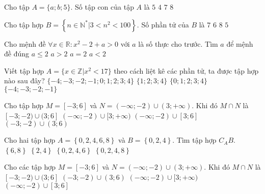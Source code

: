 \begin{ex}%
	Cho tập $A=\{a;b;5\}$. Số tập con của tập $A$ là
	\choice
	{$5$}
	{$4$}
	{$7$}
	{\True $8$}
\end{ex}

\begin{ex}%
	Cho tập hợp $B=\left\{n \in \mathbb{N}^*\bigg|3<n^2<100\right\}$. Số phần tử của $B$ là
	\choice
	{$7$}
	{$6$}
	{\True $8$}
	{$5$}
\end{ex}

\begin{ex}%
	Cho mệnh đề $\forall x \in \mathbb{R} \colon x^2-2+a>0$ với $a$ là số thực cho trước. Tìm $a$ để mệnh đề đúng
	\choice
	{$a \leq 2$}
	{\True $a>2$}
	{$a=2$}
	{$a<2$}
\end{ex}

\begin{ex}%
	Viết tập hợp $A=\lbrace x \in \mathbb{Z}|x^2<17 \rbrace $ theo cách liệt kê các phần tử, ta được tập hợp nào sau đây?
	\choice
	{\True $ \lbrace -4;-3;-2;-1;0;1;2;3;4 \rbrace $}
	{$ \lbrace 1;2;3;4 \rbrace $}
	{$\lbrace 0;1;2;3;4  \rbrace $}
	{$ \lbrace -4; -3;-2;-1 \rbrace $}
	\loigiai{
	}
\end{ex}

\begin{ex}%
	Cho tập hợp $M=[-3;6]$ và $N=(-\infty;-2)\cup (3;+\infty)$. Khi đó $M\cap N$ là
	\choice
	{\True $[-3;-2)\cup (3;6]$}
	{$(-\infty;-2)\cup [3;+\infty)$}
	{$(-\infty;-2)\cup [3;6]$}
	{$(-3;-2)\cup (3;6)$}
\end{ex}

\begin{ex}%
	Cho hai tập hợp $A = \left\{0, 2, 4, 6, 8\right\}$ và $B = \left\{0, 2, 4\right\}$. Tìm tập hợp $C_{A}B$.
	\choice
	{\True $\left\{6, 8\right\}$}
	{$\left\{2, 4\right\}$}
	{$\left\{0, 2, 4, 6\right\}$}
	{$\left\{0, 2, 4, 8\right\}$}
	\loigiai{
	}
\end{ex}

\begin{ex}%
	Cho các tập hợp $M=[-3;6]$ và $N=(-\infty;-2) \cup (3;+\infty)$. Khi đó $M \cap N$ là
	\choice
	{\True $[-3;-2) \cup (3;6]$}
	{$(-3;-2) \cup (3;6)$}
	{$(-\infty;-2) \cup [3;+\infty)$}
	{$(-\infty;-2) \cup [3;6]$}
\end{ex}

